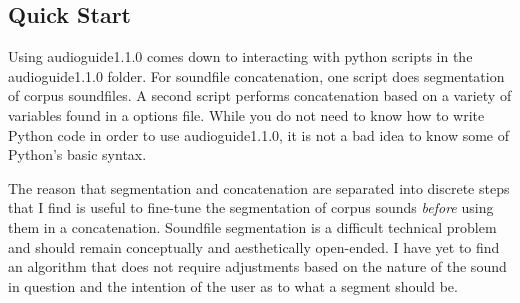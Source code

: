 \documentclass{article}
\newcommand{\ag}{audioguide1.1.0\xspace}
\begin{document}
\begin{spacing}{1.2}
  


\section{Quick Start}
Using \ag comes down to interacting with python scripts in the \ag folder.  For soundfile concatenation, one script does segmentation of corpus soundfiles.  A second script performs concatenation based on a variety of variables found in a options file.  While you do not need to know how to write Python code in order to use \ag, it is not a bad idea to know some of Python's basic syntax.

The reason that segmentation and concatenation are separated into discrete steps that I find is useful to fine-tune the segmentation of corpus sounds \emph{before} using them in a concatenation.  Soundfile segmentation is a difficult technical problem and should remain conceptually and aesthetically open-ended.  I have yet to find an algorithm that does not require adjustments based on the nature of the sound in question and the intention of the user as to what a segment should be.


\end{spacing}
\end{document}
